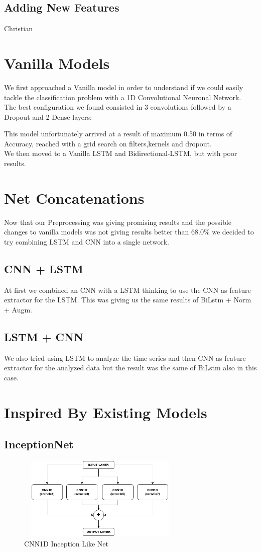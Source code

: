 \documentclass[11pt]{article}
\begin{document}
\subsection{Adding New Features}
Christian
\section{Vanilla Models}
We first approached a Vanilla model in order to understand if we could easily tackle the classification problem with a 1D Convolutional Neuronal Network.\\
The best configuration we found consisted in 3 convolutions followed by a Dropout and 2 Dense layers:

This model unfortunately arrived at a result of maximum 0.50 in terms of Accuracy, reached with a grid search on filters,kernels and dropout.\\
We then moved to a Vanilla LSTM and Bidirectional-LSTM, but with poor results.
\section{Net Concatenations}
Now that our Preprocessing was giving promising results and the possible changes to vanilla models was not giving results better than 68.0\%
we decided to try combining LSTM and CNN into a single network.
\subsection{CNN + LSTM}
At first we combined an CNN with a LSTM thinking to use the CNN as feature extractor for the LSTM.
This was giving us the same results of BiLstm + Norm + Augm.
\subsection{LSTM + CNN}
We also tried using LSTM to analyze the time series and then CNN as feature extractor for the analyzed data
but the result was the same of BiLstm also in this case.

\section{Inspired By Existing Models}
\subsection{InceptionNet}
\begin{figure}[h]
\centering
\includegraphics[width=8cm, height=4cm]{Inception}
\caption{CNN1D Inception Like Net}
\end{figure}
\end{document}
